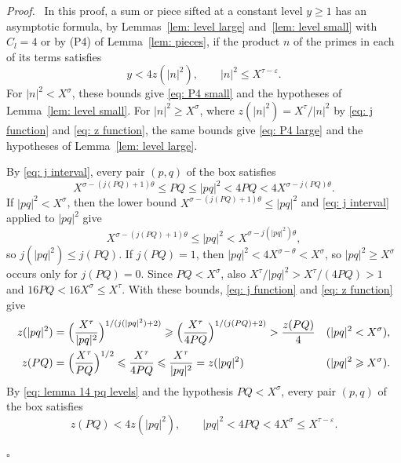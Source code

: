 \documentclass{article}
\numberwithin{equation}{section}
\newenvironment{proof}[1][Proof]{\par\medskip\noindent\textit{#1.}\ }{\hfill$\square$\par\medskip}
\newcommand{\Le}{\leqslant}
\newcommand{\Ge}{\geqslant}
\begin{document}
\begin{proof}
In this proof, a sum or piece sifted at a constant level $y \Ge 1$ has an asymptotic formula, by Lemmas~\ref{lem: level large} and~\ref{lem: level small} with $C_l = 4$ or by (P4) of Lemma~\ref{lem: pieces}, if the product $n$ of the primes in each of its terms satisfies
\begin{equation}
\label{eq: lemma 14 criterion}
y < 4z(|n|^2), \qquad |n|^2 \Le X^{\tau - \varepsilon}.
\end{equation}
For $|n|^2 < X^{\sigma}$, these bounds give \eqref{eq: P4 small} and the hypotheses of Lemma~\ref{lem: level small}. For $|n|^2 \Ge X^{\sigma}$, where $z(|n|^2) = X^{\tau}/|n|^2$ by \eqref{eq: j function} and \eqref{eq: z function}, the same bounds give \eqref{eq: P4 large} and the hypotheses of Lemma~\ref{lem: level large}.

By \eqref{eq: j interval}, every pair $(p, q)$ of the box satisfies
\begin{equation*}
X^{\sigma - (j(PQ)+1)\theta} \Le PQ \Le |pq|^2 < 4PQ < 4X^{\sigma - j(PQ)\theta}.
\end{equation*}
If $|pq|^2 < X^{\sigma}$, then the lower bound $X^{\sigma - (j(PQ)+1)\theta} \Le |pq|^2$ and \eqref{eq: j interval} applied to $|pq|^2$ give
\begin{equation*}
X^{\sigma - (j(PQ)+1)\theta} \Le |pq|^2 < X^{\sigma - j(|pq|^2)\theta},
\end{equation*}
so $j(|pq|^2) \Le j(PQ)$. If $j(PQ) = 1$, then $|pq|^2 < 4X^{\sigma - \theta} < X^{\sigma}$, so $|pq|^2 \Ge X^{\sigma}$ occurs only for $j(PQ) = 0$. Since $PQ < X^{\sigma}$, also $X^{\tau}/|pq|^2 > X^{\tau}/(4PQ) > 1$ and $16PQ < 16X^{\sigma} \Le X^{\tau}$. With these bounds, \eqref{eq: j function} and \eqref{eq: z function} give
\begin{equation}
\label{eq: lemma 14 pq levels}
\begin{aligned}
z(|pq|^2) &= \Bigl( \frac{X^{\tau}}{|pq|^2} \Bigr)^{1/(j(|pq|^2)+2)} \Ge \Bigl( \frac{X^{\tau}}{4PQ} \Bigr)^{1/(j(PQ)+2)} > \frac{z(PQ)}{4} && (|pq|^2 < X^{\sigma}), \\
z(PQ) &= \Bigl( \frac{X^{\tau}}{PQ} \Bigr)^{1/2} \Le \frac{X^{\tau}}{4PQ} \Le \frac{X^{\tau}}{|pq|^2} = z(|pq|^2) && (|pq|^2 \Ge X^{\sigma}).
\end{aligned}
\end{equation}
By \eqref{eq: lemma 14 pq levels} and the hypothesis $PQ < X^{\sigma}$, every pair $(p, q)$ of the box satisfies
\begin{equation}
\label{eq: lemma 14 pq bounds}
z(PQ) < 4z(|pq|^2), \qquad |pq|^2 < 4PQ < 4X^{\sigma} \Le X^{\tau - \varepsilon}.
\end{equation}


\end{proof}
\end{document}
